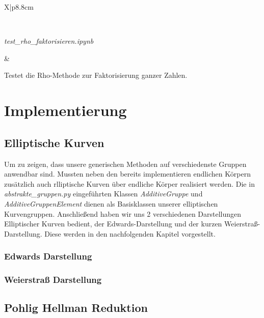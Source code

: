 \documentclass{scrartcl}
\begin{document}
\begin{table}[h]
\begin{tabularx}{\linewidth}{X|p{8.8cm}}
\begin{minipage}{\linewidth}
  \end{minipage} \\
  \hline
    \begin{minipage}{\linewidth}
    \emph{test\_rho\_faktorisieren.ipynb}
  \end{minipage} &
  \begin{minipage}{\linewidth}
      \vspace{2pt} Testet die Rho-Methode zur Faktorisierung ganzer Zahlen.   \vspace{2pt}
  \end{minipage}
\end{tabularx}
\renewcommand{\arraystretch}{1}
\caption{Übersicht der Jupyter Notebook Tests unserer Projektarbeit}
\label{tab:tests}
\end{table}


\section{Implementierung}
\label{sec:implementierung}

\subsection{Elliptische Kurven}
\label{sec:elliptische_kurven}

Um zu zeigen, dass unsere generischen Methoden auf verschiedenste Gruppen anwendbar sind. Mussten neben den bereits implementieren endlichen Körpern zusätzlich auch rlliptische Kurven über endliche Körper realisiert werden. 
Die in \emph{abstrakte\_gruppen.py} eingeführten Klassen \emph{AdditiveGruppe} und \emph{AdditiveGruppenElement} dienen als Basisklassen unserer elliptischen Kurvengruppen.
Anschließend haben wir uns 2 verschiedenen Darstellungen Elliptischer Kurven bedient, der Edwards-Darstellung und der kurzen Weierstraß-Darstellung. Diese werden in den nachfolgenden Kapitel vorgestellt.
\subsubsection{Edwards Darstellung}
\label{sec:edwards_kurven}

\subsubsection{Weierstraß Darstellung}
\label{sec:weierstrass_kurven}

\subsection{Pohlig Hellman Reduktion}
\label{sec:pohlig_hellman}
\end{document}
